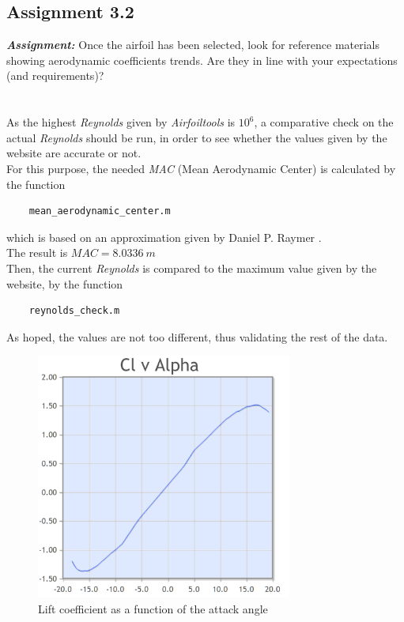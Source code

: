 \documentclass{article}
\begin{document}
\subsection{Assignment 3.2\label{Assignment_3.2}}

\textbf{\textit{Assignment:}} Once the airfoil has been selected, look for reference materials
showing aerodynamic coefficients trends. 
Are they in line with your expectations (and requirements)? \\ \\ \\ 

As the highest \textit{Reynolds} given by \textit{Airfoiltools} is $10^6$, a comparative check on the 
actual \textit{Reynolds} should be run, in order to see whether the values given by the website are 
accurate or not.\\ 
For this purpose, the needed \textit{MAC} (Mean Aerodynamic Center) is calculated by the 
function \autocite{Airbus_replacement_repo}
\begin{verbatim}
    mean_aerodynamic_center.m
\end{verbatim}
which is based on an approximation given by Daniel P. Raymer \autocite{Raymer_Daniel}. \\

The result is $MAC = 8.0336 \ m$ \\ 

Then, the current \textit{Reynolds} is compared to the maximum value given by the website, by the function

\begin{verbatim}
    reynolds_check.m
\end{verbatim}

As hoped, the values are not too different, thus validating the rest of the data.\\ 

\begin{figure}[h!]
    \centering
    \includegraphics[width=0.75\textwidth]{Sources/Plots_and_Pictures/cl_alpha_1412.png}
    \caption{Lift coefficient as a function of the attack angle \autocite{Airfoiltools}}
    \label{NACA1412}
\end{figure}
\end{document}
